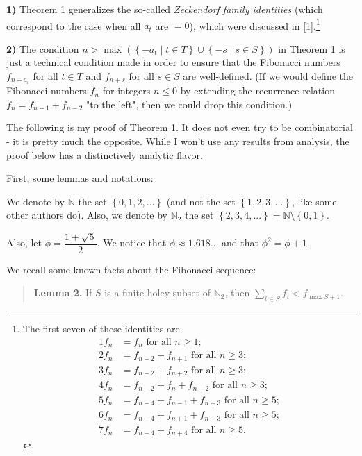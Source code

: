 \documentclass[12pt,final,notitlepage,onecolumn]{article}%
\begin{document}
\textbf{1)} Theorem 1 generalizes the so-called \textit{Zeckendorf family
identities} (which correspond to the case when all $a_{t}$ are $=0$), which
were discussed in [1].\footnote{The first seven of these identities are%
\begin{align*}
1f_{n} &  =f_{n}\text{ for all }n\geq1;\\
2f_{n} &  =f_{n-2}+f_{n+1}\text{ for all }n\geq3;\\
3f_{n} &  =f_{n-2}+f_{n+2}\text{ for all }n\geq3;\\
4f_{n} &  =f_{n-2}+f_{n}+f_{n+2}\text{ for all }n\geq3;\\
5f_{n} &  =f_{n-4}+f_{n-1}+f_{n+3}\text{ for all }n\geq5;\\
6f_{n} &  =f_{n-4}+f_{n+1}+f_{n+3}\text{ for all }n\geq5;\\
7f_{n} &  =f_{n-4}+f_{n+4}\text{ for all }n\geq5.
\end{align*}
}

\textbf{2)} The condition $n>\max\left(  \left\{  -a_{t}\mid t\in T\right\}
\cup\left\{  -s\mid s\in S\right\}  \right)  $ in Theorem 1 is just a
technical condition made in order to ensure that the Fibonacci numbers
$f_{n+a_{t}}$ for all $t\in T$ and $f_{n+s}$ for all $s\in S$ are
well-defined. (If we would define the Fibonacci numbers $f_{n}$ for integers
$n\leq0$ by extending the recurrence relation $f_{n}=f_{n-1}+f_{n-2}$ "to the
left", then we could drop this condition.)

The following is my proof of Theorem 1. It does not even try to be
combinatorial - it is pretty much the opposite. While I won't use any results
from analysis, the proof below has a distinctively analytic flavor.

First, some lemmas and notations:

We denote by $\mathbb{N}$ the set $\left\{  0,1,2,...\right\}  $ (and not the
set $\left\{  1,2,3,...\right\}  $, like some other authors do). Also, we
denote by $\mathbb{N}_{2}$ the set $\left\{  2,3,4,...\right\}  =\mathbb{N}%
\setminus\left\{  0,1\right\}  $.

Also, let $\phi=\dfrac{1+\sqrt{5}}{2}$. We notice that $\phi\approx1.618...$
and that $\phi^{2}=\phi+1$.

We recall some known facts about the Fibonacci sequence:

\begin{quote}
\textbf{Lemma 2.} If $S$ is a finite holey subset of $\mathbb{N}_{2}$, then
$\sum\limits_{t\in S}f_{t}<f_{\max S+1}$.
\end{quote}
\end{document}
